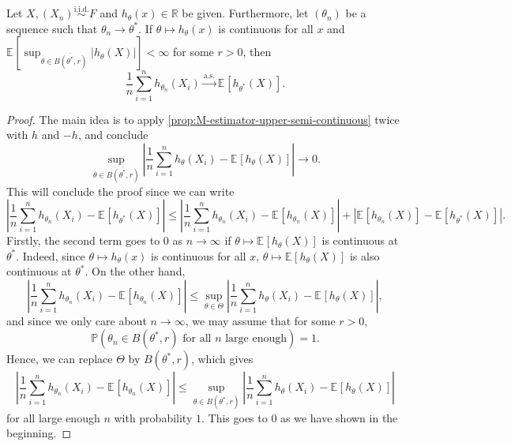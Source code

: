 \begin{theorem}\label{thm:uniform-SLLN}
	Let \(X, (X_n) \overset{\text{i.i.d.} }{\sim } F\) and \(h_\theta (x) \in \mathbb{R} \) be given. Furthermore, let \((\theta _n)\) be a sequence such that \(\theta _n \to \theta ^{\ast} \). If \(\theta \mapsto h_\theta (x)\) is continuous for all \(x\) and \(\mathbb{E}_{}[\sup _{\theta \in \overline{B(\theta ^{\ast} , r)} } \lvert h_\theta (X) \rvert ] < \infty \) for some \(r > 0\), then
	\[
		\frac{1}{n} \sum_{i=1}^{n} h_{\theta _n}(X_i)
		\overset{\text{a.s.} }{\to} \mathbb{E}_{}[h_{\theta ^{\ast}}(X)].
	\]
\end{theorem}
\begin{proof}
	The main idea is to apply \autoref{prop:M-estimator-upper-semi-continuous} twice with \(h\) and \(-h\), and conclude
	\[
		\sup _{\theta \in \overline{B(\theta ^{\ast} , r)} } \left\lvert \frac{1}{n}\sum_{i=1}^{n} h_{\theta }(X_i) - \mathbb{E}_{}[h_{\theta }(X)] \right\rvert
		\to 0.
	\]
	This will conclude the proof since we can write
	\[
		\left\lvert \frac{1}{n}\sum_{i=1}^{n} h_{\theta _n}(X_i) - \mathbb{E}_{}[h_{\theta ^{\ast} }(X)] \right\rvert
		\leq \left\lvert \frac{1}{n}\sum_{i=1}^{n} h_{\theta _n}(X_i) - \mathbb{E}_{}[h_{\theta _n}(X)] \right\rvert + \left\lvert \mathbb{E}_{}[h_{\theta _n}(X)] - \mathbb{E}_{}[h_{\theta ^{\ast} }(X)]  \right\rvert.
	\]
	Firstly, the second term goes to \(0\) as \(n \to \infty \) if \(\theta \mapsto \mathbb{E}_{}[h_\theta (X)] \) is continuous at \(\theta ^{\ast} \). Indeed, since \(\theta \mapsto h_\theta (x)\) is continuous for all \(x\), \(\theta \mapsto \mathbb{E}_{}[h_\theta (X)] \) is also continuous at \(\theta ^{\ast} \). On the other hand,
	\[
		\left\lvert \frac{1}{n}\sum_{i=1}^{n} h_{\theta _n}(X_i) - \mathbb{E}_{}[h_{\theta _n}(X)] \right\rvert
		\leq \sup _{\theta \in \Theta } \left\lvert \frac{1}{n}\sum_{i=1}^{n} h_{\theta }(X_i) - \mathbb{E}_{}[h_{\theta }(X)] \right\rvert,
	\]
	and since we only care about \(n\to \infty \), we may assume that for some \(r > 0\),
	\[
		\mathbb{P} (\theta _n \in B(\theta ^{\ast} , r) \text{ for all \(n\) large enough} ) = 1.
	\]
	Hence, we can replace \(\Theta \) by \(B(\theta ^{\ast} , r)\), which gives
	\[
		\left\lvert \frac{1}{n}\sum_{i=1}^{n} h_{\theta _n}(X_i) - \mathbb{E}_{}[h_{\theta _n}(X)] \right\rvert
		\leq \sup _{\theta \in B(\theta ^{\ast} , r)} \left\lvert \frac{1}{n}\sum_{i=1}^{n} h_{\theta }(X_i) - \mathbb{E}_{}[h_{\theta }(X)] \right\rvert
	\]
	for all large enough \(n\) with probability \(1\). This goes to \(0\) as we have shown in the beginning.
\end{proof}

